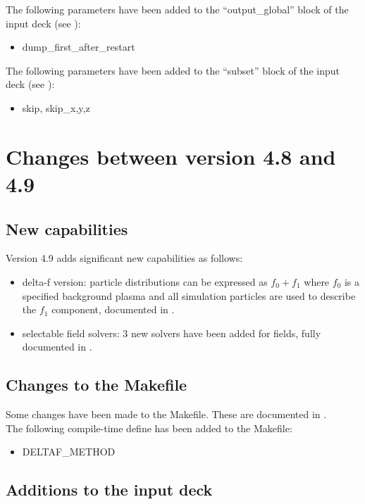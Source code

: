 \noindent The following parameters have been added to the ``output\_global''
block of the input deck (see ):
\begin{itemize}
\item dump\_first\_after\_restart
\end{itemize}
\bigskip

\noindent The following parameters have been added to the ``subset'' block of
the input deck (see ):
\begin{itemize}
\item skip, skip\_{x,y,z}
\end{itemize}
\bigskip

\section{Changes between version 4.8 and 4.9}

\subsection{New capabilities}
Version 4.9 adds significant new capabilities as follows:

\begin{itemize}
\item delta-f version: particle distributions can be expressed as
   $f_0 + f_1$ where $f_0$ is a specified background plasma and all simulation
   particles are used to describe the $f_1$ component, documented in
   .
\item selectable field solvers: 3 new solvers have been added for fields, fully
   documented in .
\end{itemize}
\bigskip

\subsection{Changes to the Makefile}

Some changes have been made to the Makefile. These are documented in
.\\

\noindent The following compile-time define has been added to the Makefile:
\begin{itemize}
\item DELTAF\_METHOD
\end{itemize}
\bigskip

\subsection{Additions to the input deck}

